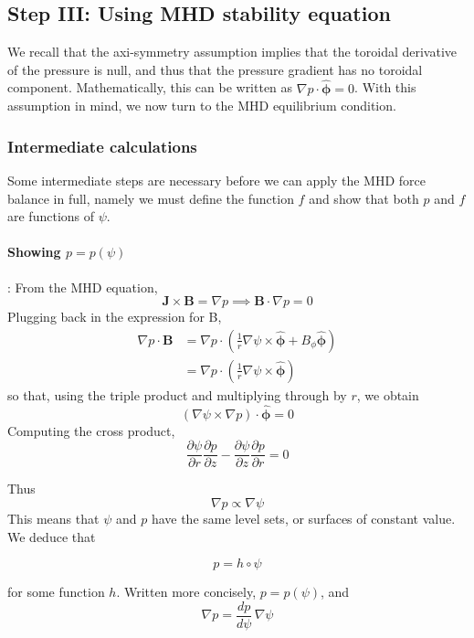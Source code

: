 \documentclass[11pt,a4paper]{article}
\begin{document}
\subsection{Step III: Using MHD stability equation}
    We recall that the axi-symmetry assumption implies that the toroidal derivative of the pressure is null, and thus that the pressure gradient has no toroidal component. Mathematically, this can be written as $\nabla p \cdot \hat{\boldsymbol{\phi}}=0$. With this assumption in mind, we now turn to the MHD equilibrium condition. 

    \subsubsection{Intermediate calculations}
    Some intermediate steps are necessary before we can apply the MHD force balance in full, namely we must define the function $f$ and show that both $p$ and $f$ are functions of $\psi$.
    
    \paragraph{Showing $p=p(\psi)$}: From the MHD equation,
    $$\mathbf{J}\times\mathbf{B}=\nabla p \implies \mathbf{B}\cdot\nabla p =0$$
    Plugging back in the expression for B,
    $$\begin{aligned}
        \nabla p \cdot \mathbf{B}&=\nabla p \cdot \left(\frac{1}{r} \nabla\psi\times\hat{\boldsymbol{\phi}}+B_\phi \hat{\boldsymbol{\phi}}\right) \\
        &= \nabla p \cdot \left(\frac{1}{r} \nabla\psi\times\hat{\boldsymbol{\phi}}\right) 
    \end{aligned}
    $$
    so that, using the triple product and multiplying through by $r$, we obtain
    $$(\nabla \psi \times \nabla p) \cdot \hat{\boldsymbol{\phi}}=0$$
    Computing the cross product,
    $$ \frac{\partial \psi}{\partial r} \frac{\partial p}{\partial z} - \frac{\partial \psi}{\partial z}\frac{\partial p}{\partial r}=0$$
    
    Thus
    $$\nabla p \propto \nabla \psi$$ 
    This means that $\psi$ and $p$ have the same level sets, or surfaces of constant value. We deduce that 

    $$p=h \circ\psi$$

    for some function $h$. Written more concisely, $p=p(\psi)$, and 
    $$\nabla p = \frac{d p}{d\psi}\,\nabla\psi$$
\end{document}
